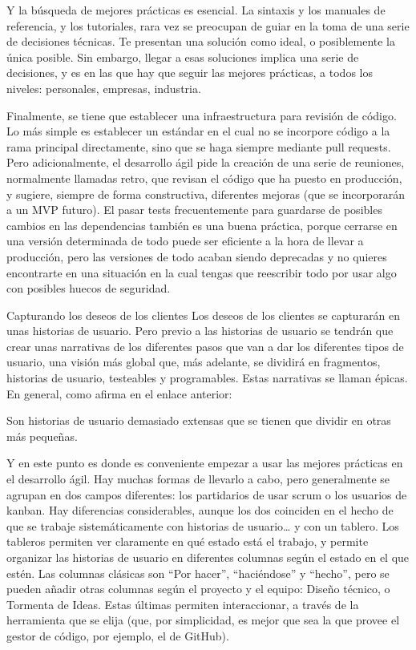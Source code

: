 Y la búsqueda de mejores prácticas es esencial. La sintaxis y los manuales de referencia, y los tutoriales, rara vez se preocupan de guiar en la toma de una serie de decisiones técnicas. Te presentan una solución como ideal, o posiblemente la única posible. Sin embargo, llegar a esas soluciones implica una serie de decisiones, y es en las que hay que seguir las mejores prácticas, a todos los niveles: personales, empresas, industria.

Finalmente, se tiene que establecer una infraestructura para revisión de código. Lo más simple es establecer un estándar en el cual no se incorpore código a la rama principal directamente, sino que se haga siempre mediante pull requests. Pero adicionalmente, el desarrollo ágil pide la creación de una serie de reuniones, normalmente llamadas retro, que revisan el código que ha puesto en producción, y sugiere, siempre de forma constructiva, diferentes mejoras (que se incorporarán a un MVP futuro). El pasar tests frecuentemente para guardarse de posibles cambios en las dependencias también es una buena práctica, porque cerrarse en una versión determinada de todo puede ser eficiente a la hora de llevar a producción, pero las versiones de todo acaban siendo deprecadas y no quieres encontrarte en una situación en la cual tengas que reescribir todo por usar algo con posibles huecos de seguridad.

Capturando los deseos de los clientes
Los deseos de los clientes se capturarán en unas historias de usuario. Pero previo a las historias de usuario se tendrán que crear unas narrativas de los diferentes pasos que van a dar los diferentes tipos de usuario, una visión más global que, más adelante, se dividirá en fragmentos, historias de usuario, testeables y programables. Estas narrativas se llaman épicas. En general, como afirma en el enlace anterior:

Son historias de usuario demasiado extensas que se tienen que dividir en otras más pequeñas.

Y en este punto es donde es conveniente empezar a usar las mejores prácticas en el desarrollo ágil. Hay muchas formas de llevarlo a cabo, pero generalmente se agrupan en dos campos diferentes: los partidarios de usar scrum o los usuarios de kanban. Hay diferencias considerables, aunque los dos coinciden en el hecho de que se trabaje sistemáticamente con historias de usuario… y con un tablero. Los tableros permiten ver claramente en qué estado está el trabajo, y permite organizar las historias de usuario en diferentes columnas según el estado en el que estén. Las columnas clásicas son “Por hacer”, “haciéndose” y “hecho”, pero se pueden añadir otras columnas según el proyecto y el equipo: Diseño técnico, o Tormenta de Ideas. Estas últimas permiten interaccionar, a través de la herramienta que se elija (que, por simplicidad, es mejor que sea la que provee el gestor de código, por ejemplo, el de GitHub).

